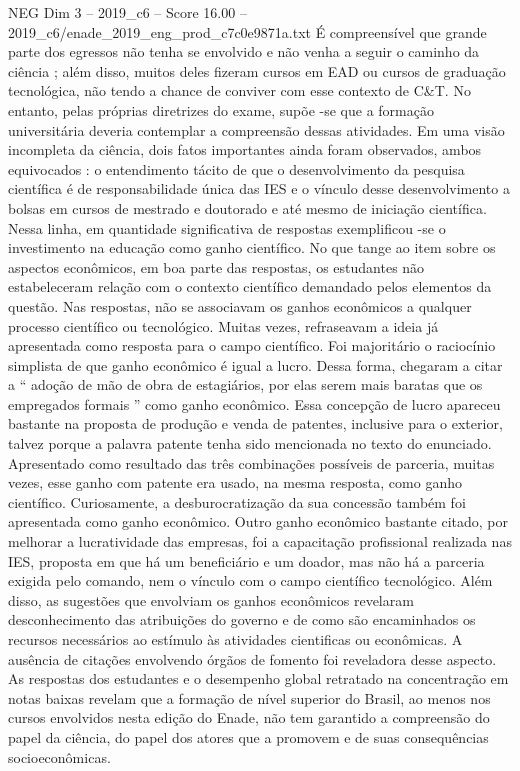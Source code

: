 \begin{textsample}{NEG Dim 3 – 2019\_c6 – Score 16.00 – 2019\_c6/enade\_2019\_eng\_prod\_c7c0e9871a.txt}
É compreensível que grande parte dos egressos não tenha se envolvido e não venha a seguir o caminho da ciência ; além disso, muitos deles fizeram cursos em EAD ou cursos de graduação tecnológica, não tendo a chance de conviver com esse contexto de C\&T.
No entanto, pelas próprias diretrizes do exame, supõe -se que a formação universitária deveria contemplar a compreensão dessas atividades.
Em uma visão incompleta da ciência, dois fatos importantes ainda foram observados, ambos equivocados : o entendimento tácito de que o desenvolvimento da pesquisa científica é de responsabilidade única das IES e o vínculo desse desenvolvimento a bolsas em cursos de mestrado e doutorado e até mesmo de iniciação científica.
Nessa linha, em quantidade significativa de respostas exemplificou -se o investimento na educação como ganho científico.
No que tange ao item sobre os aspectos econômicos, em boa parte das respostas, os estudantes não estabeleceram relação com o contexto científico demandado pelos elementos da questão.
Nas respostas, não se associavam os ganhos econômicos a qualquer processo científico ou tecnológico.
Muitas vezes, refraseavam a ideia já apresentada como resposta para o campo científico.
Foi majoritário o raciocínio simplista de que ganho econômico é igual a lucro.
Dessa forma, chegaram a citar a “ adoção de mão de obra de estagiários, por elas serem mais baratas que os empregados formais ” como ganho econômico.
Essa concepção de lucro apareceu bastante na proposta de produção e venda de patentes, inclusive para o exterior, talvez porque a palavra patente tenha sido mencionada no texto do enunciado.
Apresentado como resultado das três combinações possíveis de parceria, muitas vezes, esse ganho com patente era usado, na mesma resposta, como ganho científico.
Curiosamente, a desburocratização da sua concessão também foi apresentada como ganho econômico.
Outro ganho econômico bastante citado, por melhorar a lucratividade das empresas, foi a capacitação profissional realizada nas IES, proposta em que há um beneficiário e um doador, mas não há a parceria exigida pelo comando, nem o vínculo com o campo científico tecnológico.
Além disso, as sugestões que envolviam os ganhos econômicos revelaram desconhecimento das atribuições do governo e de como são encaminhados os recursos necessários ao estímulo às atividades cientificas ou econômicas.
A ausência de citações envolvendo órgãos de fomento foi reveladora desse aspecto.
As respostas dos estudantes e o desempenho global retratado na concentração em notas baixas revelam que a formação de nível superior do Brasil, ao menos nos cursos envolvidos nesta edição do Enade, não tem garantido a compreensão do papel da ciência, do papel dos atores que a promovem e de suas consequências socioeconômicas.

\end{textsample}
